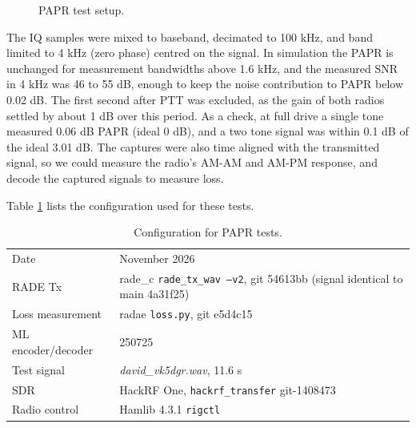 \documentclass{article}
\begin{document}
\begin{figure}[h]
\caption{PAPR test setup.}
\label{fig:papr_setup}
\begin{center}
\end{center}
\end{figure}

The IQ samples were mixed to baseband, decimated to 100 \si{kHz}, and band limited to 4 \si{kHz} (zero phase) centred on the signal.  In simulation the PAPR is unchanged for measurement bandwidths above 1.6 \si{kHz}, and the measured SNR in 4 \si{kHz} was 46 to 55 \si{dB}, enough to keep the noise contribution to PAPR below 0.02 \si{dB}.  The first second after PTT was excluded, as the gain of both radios settled by about 1 \si{dB} over this period.  As a check, at full drive a single tone measured 0.06 \si{dB} PAPR (ideal 0 \si{dB}), and a two tone signal was within 0.1 \si{dB} of the ideal 3.01 \si{dB}.  The captures were also time aligned with the transmitted signal, so we could measure the radio's AM-AM and AM-PM response, and decode the captured signals to measure loss.

Table \ref{tab:papr_config} lists the configuration used for these tests.

\begin{table}[h]
\caption{Configuration for PAPR tests.}
\label{tab:papr_config}
\centering
\begin{tabular}{ l | p{7.5cm} }
 \hline
 Date & November 2026 \\
 RADE Tx & rade\_c \texttt{rade\_tx\_wav --v2}, git 54613bb (signal identical to main 4a31f25) \\
 Loss measurement & radae \texttt{loss.py}, git e5d4c15 \\
 ML encoder/decoder & 250725 \\
 Test signal & \emph{david\_vk5dgr.wav}, 11.6 s \\
 SDR & HackRF One, \texttt{hackrf\_transfer} git-1408473 \\
 Radio control & Hamlib 4.3.1 \texttt{rigctl} \\
 \hline
\end{tabular}
\end{table}
\end{document}
